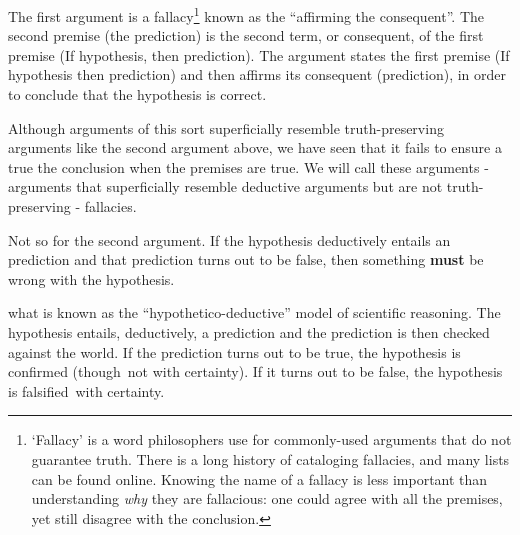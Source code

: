 \begin{refsection}
The first argument is a fallacy\footnote{‘Fallacy’ is a word philosophers use for commonly-used arguments that do not guarantee truth. There is a long history of cataloging fallacies, and many lists can be found online. Knowing the name of a fallacy is less important than understanding \emph{why} they are fallacious: one could agree with all the premises, yet still disagree with the conclusion.} known as the ``affirming the consequent''. The second premise (the prediction) is the second term, or consequent, of the first premise (If hypothesis, then prediction). The argument states the first premise (If hypothesis then prediction) and then affirms its consequent (prediction), in order to conclude that the hypothesis is correct. 

Although arguments of this sort superficially resemble truth-preserving arguments like the second argument above, we have seen that it fails to ensure a true the conclusion when the premises are true. We will call these arguments - arguments that superficially resemble deductive arguments but are not truth-preserving - fallacies.

Not so for the second argument. If the hypothesis deductively entails an prediction and that prediction turns out to be false, then something \textbf{must} be wrong with the hypothesis. 

 what is known as the ``hypothetico-deductive'' model of scientific reasoning. The hypothesis entails, deductively, a prediction and the prediction is then checked against the world. If the prediction turns out to be true, the hypothesis is confirmed (though not with certainty). If it turns out to be false, the hypothesis is falsified with certainty. 


\end{refsection}
